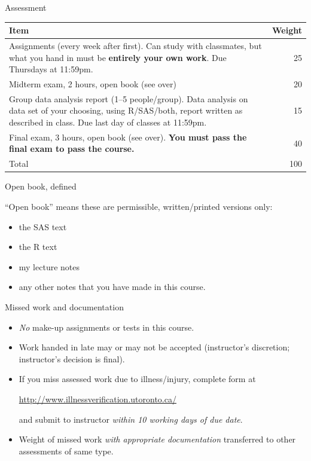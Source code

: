 \documentclass[unknownkeysallowed]{beamer}\usepackage[]{graphicx}\usepackage[]{color}
\begin{document}
\begin{frame}{Assessment}

  \begin{tabular}{p{3.5in}r}
    \hline
    Item & Weight\\
    \hline
    Assignments (every week after first). Can study with classmates, but what you hand in must
    be \textbf{entirely your own work}. Due Thursdays at 11:59pm. & 25\\
    \hline
    Midterm exam, 2 hours, open book (see over) & 20\\
    \hline
    Group data analysis report (1--5 people/group). Data analysis on data set of your choosing,
    using R/SAS/both, report written as described in class.
    Due last
    day of classes at 11:59pm. & 15 \\
    \hline
    Final exam, 3 hours, open book (see over). \textbf{You must pass
      the final exam to pass the course.} & 40\\
    \hline
    Total & 100\\
    \hline
  \end{tabular}

\bigskip

  
  
\end{frame}

\begin{frame}[fragile]{Open book, defined}
  
``Open book'' means these are permissible, written/printed versions only:

\begin{itemize}
\item the SAS text
\item the R text
\item my lecture notes
\item any other notes that you have made in this course.
\end{itemize}
  
  
\end{frame}

\begin{frame}[fragile]{Missed work and documentation}

  \begin{itemize}
  \item \emph{No} make-up  assignments or tests in this course.
  \item Work handed in late may or may not be accepted (instructor's
    discretion; instructor's decision is final).
  \item If you miss assessed work due to illness/injury, complete form
    at

\url{ http://www.illnessverification.utoronto.ca/}

    and submit to instructor \emph{within 10 working days of due date}.
  \item Weight of missed work \emph{with appropriate documentation}
    transferred to other assessments of same type.
  \end{itemize}
  
\end{frame}
\end{document}
